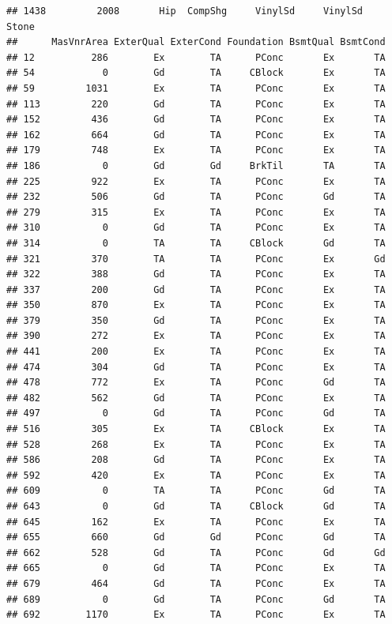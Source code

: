 \documentclass[]{article}
\begin{document}
\begin{verbatim}
## 1438         2008       Hip  CompShg     VinylSd     VinylSd      Stone
##      MasVnrArea ExterQual ExterCond Foundation BsmtQual BsmtCond
## 12          286        Ex        TA      PConc       Ex       TA
## 54            0        Gd        TA     CBlock       Ex       TA
## 59         1031        Ex        TA      PConc       Ex       TA
## 113         220        Gd        TA      PConc       Ex       TA
## 152         436        Gd        TA      PConc       Ex       TA
## 162         664        Gd        TA      PConc       Ex       TA
## 179         748        Ex        TA      PConc       Ex       TA
## 186           0        Gd        Gd     BrkTil       TA       TA
## 225         922        Ex        TA      PConc       Ex       TA
## 232         506        Gd        TA      PConc       Gd       TA
## 279         315        Ex        TA      PConc       Ex       TA
## 310           0        Gd        TA      PConc       Ex       TA
## 314           0        TA        TA     CBlock       Gd       TA
## 321         370        TA        TA      PConc       Ex       Gd
## 322         388        Gd        TA      PConc       Ex       TA
## 337         200        Gd        TA      PConc       Ex       TA
## 350         870        Ex        TA      PConc       Ex       TA
## 379         350        Gd        TA      PConc       Ex       TA
## 390         272        Ex        TA      PConc       Ex       TA
## 441         200        Ex        TA      PConc       Ex       TA
## 474         304        Gd        TA      PConc       Ex       TA
## 478         772        Ex        TA      PConc       Gd       TA
## 482         562        Gd        TA      PConc       Ex       TA
## 497           0        Gd        TA      PConc       Gd       TA
## 516         305        Ex        TA     CBlock       Ex       TA
## 528         268        Ex        TA      PConc       Ex       TA
## 586         208        Gd        TA      PConc       Ex       TA
## 592         420        Ex        TA      PConc       Ex       TA
## 609           0        TA        TA      PConc       Gd       TA
## 643           0        Gd        TA     CBlock       Gd       TA
## 645         162        Ex        TA      PConc       Ex       TA
## 655         660        Gd        Gd      PConc       Gd       TA
## 662         528        Gd        TA      PConc       Gd       Gd
## 665           0        Gd        TA      PConc       Ex       TA
## 679         464        Gd        TA      PConc       Ex       TA
## 689           0        Gd        TA      PConc       Gd       TA
## 692        1170        Ex        TA      PConc       Ex       TA

\end{verbatim}
\end{document}
